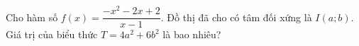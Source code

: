 \begin{ex}
Cho hàm số $f(x)=\dfrac{-x^2-2x+2}{x-1}$. Đồ thị đã cho có tâm đối xứng là $I(a;b)$. Giá trị của biểu thức $T=4a^2+6b^2$ là bao nhiêu?
\end{ex}
